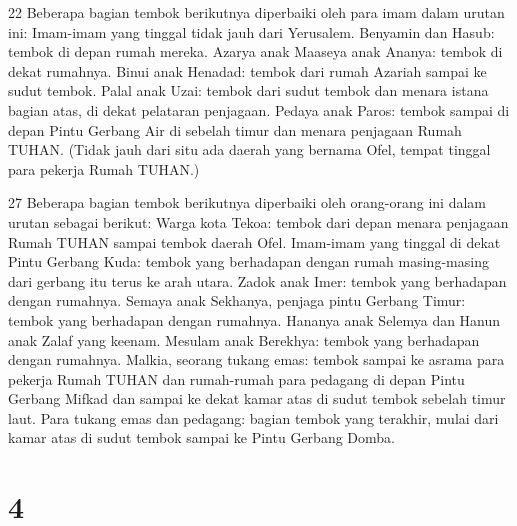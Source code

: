 \par 22 Beberapa bagian tembok berikutnya diperbaiki oleh para imam dalam urutan ini: Imam-imam yang tinggal tidak jauh dari Yerusalem. Benyamin dan Hasub: tembok di depan rumah mereka. Azarya anak Maaseya anak Ananya: tembok di dekat rumahnya. Binui anak Henadad: tembok dari rumah Azariah sampai ke sudut tembok. Palal anak Uzai: tembok dari sudut tembok dan menara istana bagian atas, di dekat pelataran penjagaan. Pedaya anak Paros: tembok sampai di depan Pintu Gerbang Air di sebelah timur dan menara penjagaan Rumah TUHAN. (Tidak jauh dari situ ada daerah yang bernama Ofel, tempat tinggal para pekerja Rumah TUHAN.)
\par 27 Beberapa bagian tembok berikutnya diperbaiki oleh orang-orang ini dalam urutan sebagai berikut: Warga kota Tekoa: tembok dari depan menara penjagaan Rumah TUHAN sampai tembok daerah Ofel. Imam-imam yang tinggal di dekat Pintu Gerbang Kuda: tembok yang berhadapan dengan rumah masing-masing dari gerbang itu terus ke arah utara. Zadok anak Imer: tembok yang berhadapan dengan rumahnya. Semaya anak Sekhanya, penjaga pintu Gerbang Timur: tembok yang berhadapan dengan rumahnya. Hananya anak Selemya dan Hanun anak Zalaf yang keenam. Mesulam anak Berekhya: tembok yang berhadapan dengan rumahnya. Malkia, seorang tukang emas: tembok sampai ke asrama para pekerja Rumah TUHAN dan rumah-rumah para pedagang di depan Pintu Gerbang Mifkad dan sampai ke dekat kamar atas di sudut tembok sebelah timur laut. Para tukang emas dan pedagang: bagian tembok yang terakhir, mulai dari kamar atas di sudut tembok sampai ke Pintu Gerbang Domba.

\chapter{4}

